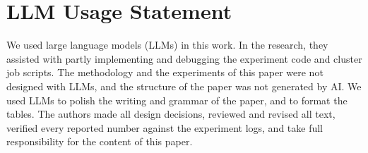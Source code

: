 \section*{LLM Usage Statement}

We used large language models (LLMs)  in this work. In the research, they assisted with partly implementing and debugging the experiment code and cluster job scripts. The methodology and the experiments of this paper were not designed with LLMs, and the structure of the paper was not generated by AI.
We used LLMs to polish the writing and grammar of the paper, and to format the tables.
The authors made all design decisions, reviewed and revised all text, verified every reported number against the experiment logs, and take full responsibility for the content of this paper.
